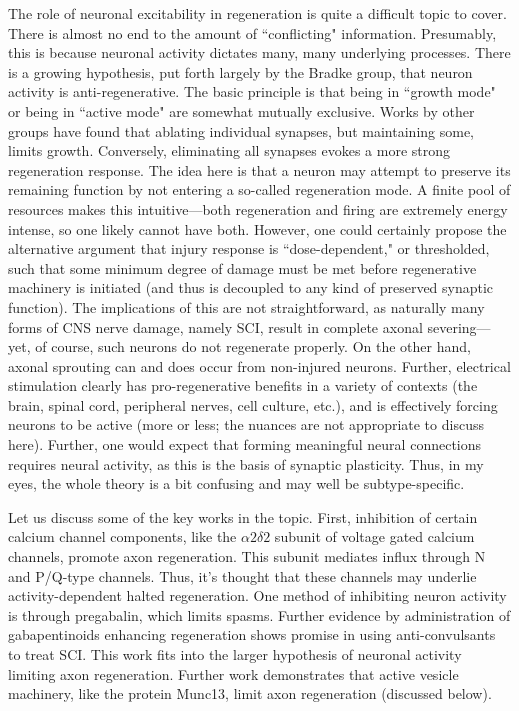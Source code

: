 The role of neuronal excitability in regeneration is quite a difficult topic to cover. There is almost no end to the amount of ``conflicting" information. Presumably, this is because neuronal activity dictates many, many underlying processes. There is a growing hypothesis, put forth largely by the Bradke group, that neuron activity is anti-regenerative. The basic principle is that being in ``growth mode" or being in ``active mode" are somewhat mutually exclusive. Works by other groups have found that ablating individual synapses, but maintaining some, limits growth. Conversely, eliminating all synapses evokes a more strong regeneration response. The idea here is that a neuron may attempt to preserve its remaining function by not entering a so-called regeneration mode. A finite pool of resources makes this intuitive---both regeneration and firing are extremely energy intense, so one likely cannot have both. However, one could certainly propose the alternative argument that injury response is ``dose-dependent," or thresholded, such that some minimum degree of damage must be met before regenerative machinery is initiated (and thus is decoupled to any kind of preserved synaptic function). The implications of this are not straightforward, as naturally many forms of CNS nerve damage, namely SCI, result in complete axonal severing---yet, of course, such neurons do not regenerate properly. On the other hand, axonal sprouting can and does occur from non-injured neurons. Further, electrical stimulation clearly has pro-regenerative benefits in a variety of contexts (the brain, spinal cord, peripheral nerves, cell culture, etc.), and is effectively forcing neurons to be active (more or less; the nuances are not appropriate to discuss here). Further, one would expect that forming meaningful neural connections requires neural activity, as this is the basis of synaptic plasticity. Thus, in my eyes, the whole theory is a bit confusing and may well be subtype-specific.\newline

Let us discuss some of the key works in the topic. First, inhibition of certain calcium channel components, like the $\alpha2\delta2$ subunit of voltage gated calcium channels, promote axon regeneration. This subunit mediates influx through N and P/Q-type channels. Thus, it's thought that these channels may underlie activity-dependent halted regeneration. One method of inhibiting neuron activity is through pregabalin, which limits spasms. Further evidence by administration of gabapentinoids enhancing regeneration shows promise in using anti-convulsants to treat SCI. This work fits into the larger hypothesis of neuronal activity limiting axon regeneration. Further work demonstrates that active vesicle machinery, like the protein Munc13, limit axon regeneration (discussed below).\newline

